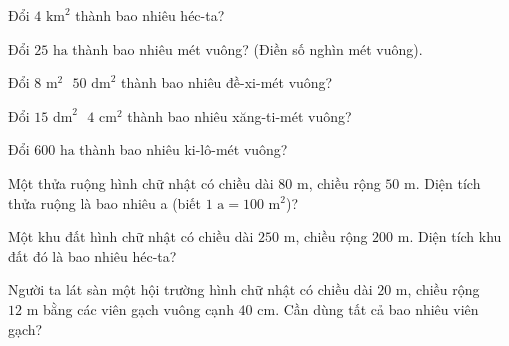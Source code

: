 
\begin{ex}
  Đổi $4\text{ km}^2$ thành bao nhiêu héc-ta?
\end{ex}

\begin{ex}
  Đổi $25\text{ ha}$ thành bao nhiêu mét vuông? (Điền số nghìn mét vuông).
\end{ex}

\begin{ex}
  Đổi $8\text{ m}^2\text{ } 50\text{ dm}^2$ thành bao nhiêu đề-xi-mét vuông?
\end{ex}

\begin{ex}
  Đổi $15\text{ dm}^2\text{ } 4\text{ cm}^2$ thành bao nhiêu xăng-ti-mét vuông?
\end{ex}

\begin{ex}
  Đổi $600\text{ ha}$ thành bao nhiêu ki-lô-mét vuông?
\end{ex}

\begin{ex}
  Một thửa ruộng hình chữ nhật có chiều dài $80\text{ m}$, chiều rộng $50\text{ m}$. Diện tích thửa ruộng là bao nhiêu a (biết $1\text{ a} = 100\text{ m}^2$)?
\end{ex}

\begin{ex}
  Một khu đất hình chữ nhật có chiều dài $250\text{ m}$, chiều rộng $200\text{ m}$. Diện tích khu đất đó là bao nhiêu héc-ta?
\end{ex}

\begin{ex}
  Người ta lát sàn một hội trường hình chữ nhật có chiều dài $20\text{ m}$, chiều rộng $12\text{ m}$ bằng các viên gạch vuông cạnh $40\text{ cm}$. Cần dùng tất cả bao nhiêu viên gạch?
\end{ex}

